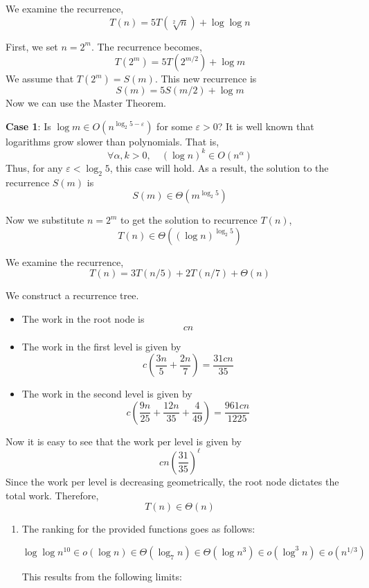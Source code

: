 \documentclass[12pt,twoside]{article}
\begin{document}
\begin{problems}
\begin{problemparts}
\problempart %

We examine the recurrence,
$$ T(n) = 5 T(\sqrt[2]{n}) + \log \log n $$

First, we set $n = 2^m$. The recurrence becomes,
$$ T(2^m) = 5 T(2^{m / 2}) + \log m $$
We assume that $T(2^m) = S(m)$. This new recurrence is
$$ S(m) = 5 S(m / 2) + \log m $$
Now we can use the Master Theorem. 

\textbf{Case 1}: Is $\log m \in O(n^{\log_2 5 - \varepsilon})$ for some 
$\varepsilon > 0$? It is well known that logarithms grow slower than polynomials.
That is,
$$ \forall \alpha, k > 0,\quad \left(\log n\right)^k \in O\left(n^\alpha\right) $$
Thus, for any $\varepsilon < \log_2 5$, this case will hold.  As a result, the
solution to the recurrence $S(m)$ is
$$ S(m) \in \Theta\left(m^{\log_2 5}\right) $$

Now we substitute $n = 2^m$ to get the solution to recurrence $T(n)$,
$$ T(n) \in \Theta\left((\log n)^{\log_2 5}\right) $$

\problempart %

We examine the recurrence,
$$ T(n) = 3 T(n / 5) + 2 T(n/7) + \Theta(n) $$

We construct a recurrence tree.
\begin{itemize}
    \item The work in the root node is
        $$c n $$
    \item The work in the first level is given by
        $$c \left(\frac{3n}{5} + \frac{2n}{7}\right) = \frac{31c n}{35} $$
    \item The work in the second level is given by
        $$c \left(\frac{9n}{25} + \frac{12n}{35} + \frac{4}{49}\right) = 
        \frac{961 c n}{1225} $$
\end{itemize}

Now it is easy to see that the work per level is given by
$$ c n \left(\frac{31}{35}\right)^\ell $$
Since the work per level is decreasing geometrically, the root node dictates
the total work. Therefore,
$$ T(n) \in \Theta(n) $$

\problempart %
  \begin{enumerate}
    \item The ranking for the provided functions goes as follows:

    $$ \log \log n^{10} \in o(\log n) \in \Theta(\log_7 n) \in \Theta(\log n^3) 
    \in o(\log^3 n) \in o(n^{1/3}) $$
    
    This results from the following limits:
    

\end{enumerate}
\end{problemparts}
\end{problems}
\end{document}
